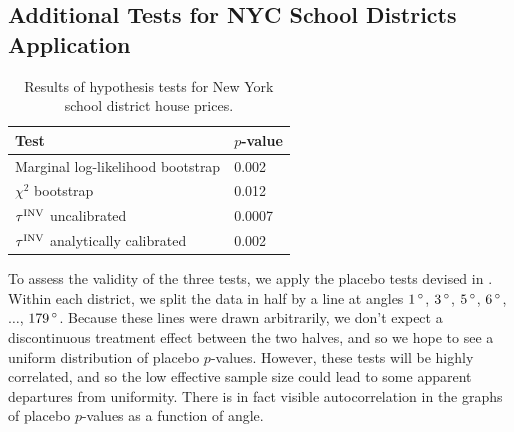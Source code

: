 \subsection{Additional Tests for NYC School Districts Application}
\label{sec:nyc_hypothesis_tests}

\begin{table}[tbp]
    \centering
    \bgroup
    \def\arraystretch{1.1}%
    \begin{tabular}{ll}
        \hline
        Test                   & \(p\)-value \\
        \hline
        Marginal log-likelihood bootstrap & 0.002     \\
        \(\chi^2\) bootstrap     & 0.012     \\
        \(\tau^{\mathrm{INV}}\) uncalibrated & 0.0007    \\
        \(\tau^{\mathrm{INV}}\) analytically calibrated   & 0.002 \\
        \hline
    \end{tabular}
    \egroup
    \caption{
		Results of hypothesis tests for New York school district house prices.
    	\label{table:NYC_tests}
	}
\end{table}

	To assess the validity of the three tests, we apply the placebo tests devised in .
Within each district, we split the data in half by a line at angles \(1{\,^\circ}\), \(3{\,^\circ}\), \(5{\,^\circ}\), \(6{\,^\circ}\), \(\dotsc\), \(179{\,^\circ}\).
Because these lines were drawn arbitrarily, we don't expect a discontinuous treatment effect between the two halves, and so we hope to see a uniform distribution of placebo \(p\)-values.
However, these tests will be highly correlated,
and so the low effective sample size could lead to some apparent departures from uniformity.
There is in fact visible autocorrelation in the graphs of placebo \(p\)-values as a function of angle.

